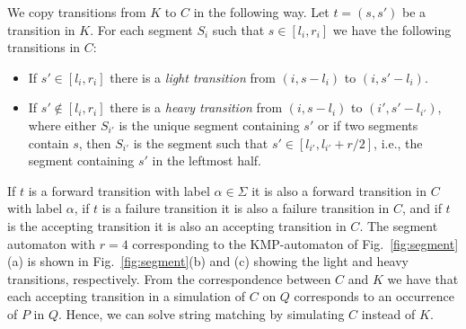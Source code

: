 \documentclass{article}
\begin{document}
We copy transitions from $K$ to $C$ in the following way. Let $t = (s,
s')$ be a transition in $K$. For each segment $S_i$ such that $s \in
[l_i, r_i]$ we have the following transitions in $C$:
\begin{itemize}
\item If $s' \in [l_i, r_i]$ there is a \emph{light transition} from $(i, s - l_i)$ to $(i, s' - l_i)$. 
\item If $s' \not\in [l_i, r_i]$ there is a \emph{heavy transition} from $(i, s -l_i)$ to $(i', s' - l_{i'})$, where either $S_{i'}$ is the unique segment containing $s'$ or if two segments contain $s$, then $S_{i'}$ is the segment such that $s' \in [l_{i'}, l_{i'} + r/2]$, i.e., the segment containing $s'$ in the leftmost half.
\end{itemize}
If $t$ is a forward transition with label $\alpha \in \Sigma$ it is
also a forward transition in $C$ with label $\alpha$, if $t$ is a
failure transition it is also a failure transition in $C$, and if $t$
is the accepting transition it is also an accepting transition in $C$.
The segment automaton with $r = 4$ corresponding to the KMP-automaton
of Fig.~\ref{fig:segment}(a) is shown in Fig.~\ref{fig:segment}(b) and
(c) showing the light and heavy transitions, respectively. From the
correspondence between $C$ and $K$ we have that each accepting
transition in a simulation of $C$ on $Q$ corresponds to an occurrence
of $P$ in $Q$. Hence, we can solve string matching by simulating $C$
instead of $K$.
\end{document}
